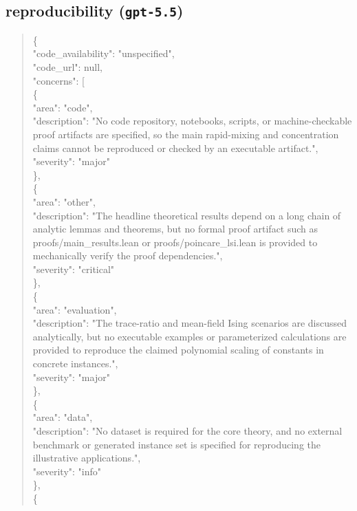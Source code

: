 \documentclass[11pt]{article}
\begin{document}
\subsection*{reproducibility (\texttt{gpt-5.5})}
\begin{quote}\small\ttfamily\raggedright
\{\\
  "code\_availability": "unspecified",\\
  "code\_url": null,\\
  "concerns": [\\
    \{\\
      "area": "code",\\
      "description": "No code repository, notebooks, scripts, or machine-checkable proof artifacts are specified, so the main rapid-mixing and concentration claims cannot be reproduced or checked by an executable artifact.",\\
      "severity": "major"\\
    \},\\
    \{\\
      "area": "other",\\
      "description": "The headline theoretical results depend on a long chain of analytic lemmas and theorems, but no formal proof artifact such as proofs/main\_results.lean or proofs/poincare\_lsi.lean is provided to mechanically verify the proof dependencies.",\\
      "severity": "critical"\\
    \},\\
    \{\\
      "area": "evaluation",\\
      "description": "The trace-ratio and mean-field Ising scenarios are discussed analytically, but no executable examples or parameterized calculations are provided to reproduce the claimed polynomial scaling of constants in concrete instances.",\\
      "severity": "major"\\
    \},\\
    \{\\
      "area": "data",\\
      "description": "No dataset is required for the core theory, and no external benchmark or generated instance set is specified for reproducing the illustrative applications.",\\
      "severity": "info"\\
    \},\\
    \{\\

\end{quote}
\end{document}
